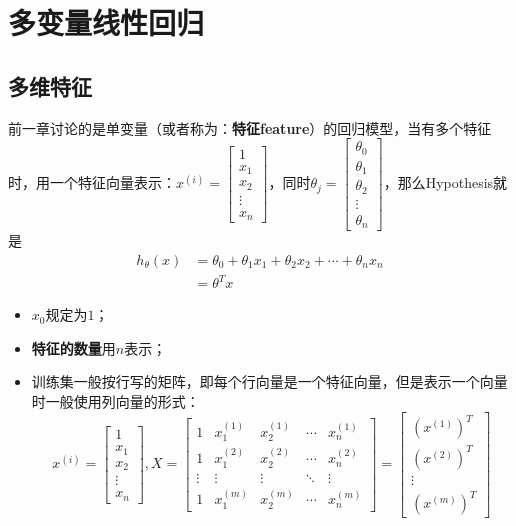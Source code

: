 \documentclass[../main.tex]{subfiles}
\begin{document}
\chapter{多变量线性回归}
\section{多维特征}
前一章讨论的是单变量（或者称为：{\bfseries 特征feature}）的回归模型，当有多个特征时，用一个特征向量表示：\(x^{(i)} = \begin{bmatrix}
    1 \\x_1 \\x_2\\\vdots\\x_n
\end{bmatrix}\)，同时\(θ_j = \begin{bmatrix}
    θ_0 \\θ_1 \\θ_2\\\vdots\\θ_n
\end{bmatrix}\)，那么Hypothesis就是
\begin{align*}
    h_θ(x) & = θ_0+θ_1x_1+θ_2x_2+\cdots+θ_nx_n \\
           & = θ^Tx
\end{align*}
\begin{remark}
    \begin{itemize}
        \item \(x_0\)规定为\(1\)；
        \item \textbf{特征的数量}用\(n\)表示；
        \item 训练集一般按行写的矩阵，即每个行向量是一个特征向量，但是表示一个向量时一般使用列向量的形式：
        \[x^{(i)} = \begin{bmatrix}1 \\x_1 \\x_2\\\vdots\\x_n\end{bmatrix},
            X = \begin{bmatrix}
                1      & x^{(1)}_1 & x^{(1)}_2 & \cdots & x^{(1)}_n \\
                1      & x^{(2)}_1 & x^{(2)}_2 & \cdots & x^{(2)}_n \\
                \vdots & \vdots    & \vdots    & \ddots & \vdots    \\
                1      & x^{(m)}_1 & x^{(m)}_2 & \cdots & x^{(m)}_n
            \end{bmatrix} = \begin{bmatrix}
                ( x^{(1)})^T \\(x^{(2)})^T\\\vdots \\(x^{(m)})^T
            \end{bmatrix}
        \]
    \end{itemize}
\end{remark}
\end{document}
